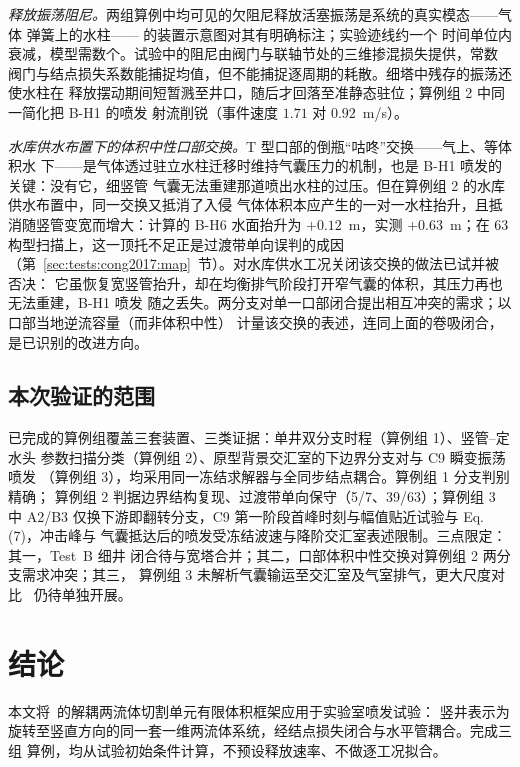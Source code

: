 \documentclass[preprint,12pt]{elsarticle}
\begin{document}
\emph{释放振荡阻尼。}两组算例中均可见的欠阻尼释放活塞振荡是系统的真实模态——气体
弹簧上的水柱——\cite{vasconcelos2011} 的装置示意图对其有明确标注；实验迹线约一个
时间单位内衰减，模型需数个。试验中的阻尼由阀门与联轴节处的三维掺混损失提供，常数
阀门与结点损失系数能捕捉均值，但不能捕捉逐周期的耗散。细塔中残存的振荡还使水柱在
释放摆动期间短暂溅至井口，随后才回落至准静态驻位；算例组 2 中同一简化把 B-H1 的喷发
射流削锐（事件速度 $1.71$ 对 $0.92$~m/s）。

\emph{水库供水布置下的体积中性口部交换。}T 型口部的倒瓶``咕咚''交换——气上、等体积水
下——是气体透过驻立水柱迁移时维持气囊压力的机制，也是 B-H1 喷发的关键：没有它，细竖管
气囊无法重建那道喷出水柱的过压。但在算例组 2 的水库供水布置中，同一交换又抵消了入侵
气体体积本应产生的一对一水柱抬升，且抵消随竖管变宽而增大：计算的 B-H6 水面抬升为
$+0.12$~m，实测 $+0.63$~m；在 63 构型扫描上，这一顶托不足正是过渡带单向误判的成因
（第~\ref{sec:tests:cong2017:map}~节）。对水库供水工况关闭该交换的做法已试并被否决：
它虽恢复宽竖管抬升，却在均衡排气阶段打开窄气囊的体积，其压力再也无法重建，B-H1 喷发
随之丢失。两分支对单一口部闭合提出相互冲突的需求；以口部当地逆流容量（而非体积中性）
计量该交换的表述，连同上面的卷吸闭合，是已识别的改进方向。

\subsection{本次验证的范围}

已完成的算例组覆盖三套装置、三类证据：单井双分支时程（算例组 1）、竖管--定水头
参数扫描分类（算例组 2）、原型背景交汇室的下边界分支对与 C9 瞬变振荡喷发
（算例组 3），均采用同一冻结求解器与全同步结点耦合。算例组 1 分支判别精确；
算例组 2 判据边界结构复现、过渡带单向保守（5/7、39/63）；算例组 3 中 A2/B3
仅换下游即翻转分支，C9 第一阶段首峰时刻与幅值贴近试验与 Eq.(7)，冲击峰与
气囊抵达后的喷发受冻结波速与降阶交汇室表述限制。三点限定：其一，Test~B 细井
闭合待与宽塔合并；其二，口部体积中性交换对算例组 2 两分支需求冲突；其三，
算例组 3 未解析气囊输运至交汇室及气室排气，更大尺度对比~\cite{muller2017}
仍待单独开展。

\section{结论}
\label{sec:conclusions}

本文将~\cite{xue2026model}的解耦两流体切割单元有限体积框架应用于实验室喷发试验：
竖井表示为旋转至竖直方向的同一套一维两流体系统，经结点损失闭合与水平管耦合。完成三组
算例，均从试验初始条件计算，不预设释放速率、不做逐工况拟合。
\end{document}
